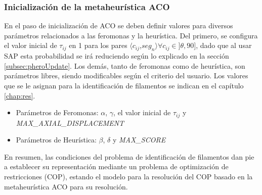 \subsubsection{Inicializaci\'on de la metaheur\'istica ACO}

En el paso de inicializaci\'on de ACO se deben definir valores para diversos par\'ametros relacionados a las feromonas y la heur\'istica. Del primero, se configura el valor inicial de $\tau_{ij}$ en 1 para los pares $\langle c_{ij}$,$ seg_{n}\rangle \forall c_{ij} \in ]\theta, 90]$, dado que al usar SAP esta probabilidad se ir\'a reduciendo seg\'un lo explicado en la secci\'on \ref{subsec:pheroUpdate}. Los dem\'as, tanto de feromonas como de heur\'istica, son par\'ametros libres, siendo modificables seg\'un el criterio del usuario. Los valores que se le asignan para la identificaci\'on de filamentos se indican en el cap\'itulo \ref{chap:res}.


\begin{itemize}
    \item Par\'ametros de Feromonas: $\alpha$, $\gamma$, el valor inicial de $\tau_{ij}$ y {\it MAX\_AXIAL\_DISPLACEMENT}
    \item Par\'ametros de Heur\'istica: $\beta$, $\delta$ y {\it MAX\_SCORE}
\end{itemize}


En resumen, las condiciones del problema de identificaci\'on de filamentos dan pie a establecer su representaci\'on mediante un problema de optimizaci\'on de restricciones (COP), estando el modelo para la resoluci\'on del COP basado en la metaheur\'istica ACO para su resoluci\'on.